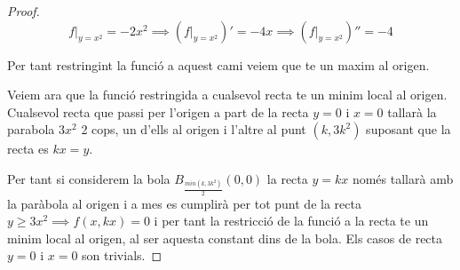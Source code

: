 \documentclass[12pt, a4papre]{article}
\begin{document}
\begin{proof}
	\[
		f|_{y=x^2} = -2x^2 \implies (f|_{y=x^2})' = -4x \implies (f|_{y=x^2})'' = -4
	\]
	
	Per tant restringint la funció a aquest cami veiem que te un maxim al origen.
	
	Veiem ara que la funció restringida a cualsevol recta te un minim local al origen. Cualsevol recta que passi per l'origen a part de la recta $y=0$ i $x=0$ tallarà la parabola $3x^2$ 2 cops, un d'ells al origen i l'altre al punt $(k, 3k^2)$ suposant que la recta es $kx=y$.
	
	Per tant si considerem la bola $B_{\frac{min(k, 3k^2)}{2}}(0, 0)$ la recta $y = kx$ només tallarà amb la paràbola al origen i a mes es cumplirà per tot punt de la recta $y \geq 3x^2 \implies f(x, kx) = 0$ i per tant la restricció de la funció a la recta te un minim local al origen, al ser aquesta constant dins de la bola. Els casos de recta $y=0$ i $x=0$ son trivials.
	
	
	\end{proof}
	
	
	
	
\end{document}

